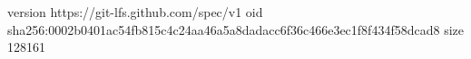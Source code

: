 version https://git-lfs.github.com/spec/v1
oid sha256:0002b0401ac54fb815c4c24aa46a5a8dadacc6f36c466e3ec1f8f434f58dcad8
size 128161
